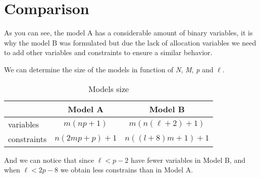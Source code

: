\section{Comparison}
As you can see,
the model A
has a considerable amount of binary variables,
it is why the model B was formulated
but due the lack of allocation variables
we need to add other variables and constraints
to ensure a similar behavior.

We can determine the size of the models
in function of \textit{N}, \textit{M}, \textit{p} and $\ell$.

\begin{table}[h]
  \centering
  \begin{tabular}{c|c|c|}
    \cline{2-3}
    & Model A & Model B \\ \hline
    \multicolumn{1}{|l|}{variables} &
    $m(np+1)$ &
    $m(n(\ell+2)+1)$ \\ \hline
    \multicolumn{1}{|l|}{constraints} &
    $n(2mp+p)+1$ &
    $n((l+8)m+1)+1$ \\ \hline
  \end{tabular}
  \caption{Models size}
\end{table}

And we can notice
that since $\ell < p - 2$
have fewer variables
in Model B,
and when $\ell < 2p - 8$
we obtain less constrains
than in Model A.
